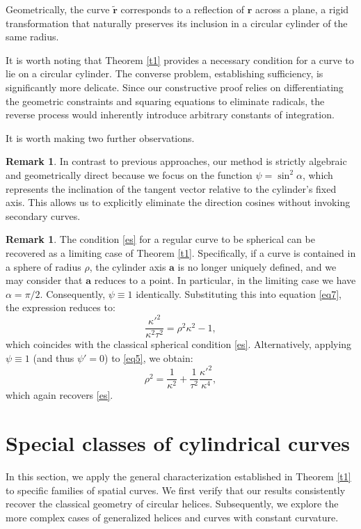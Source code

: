 \documentclass[a4paper,12pt]{amsart}
\theoremstyle{plain}
\theoremstyle{definition}
\newtheorem{remark}[theorem]{Remark}
\newcommand{\bfr}{\mathbf{r}}
\newcommand{\bfa}{\mathbf{a}}
\begin{document}
Geometrically, the curve $\tilde{\bfr}$ corresponds to a reflection of $\bfr$ across a plane, a rigid transformation that naturally preserves its inclusion in a circular cylinder of the same radius.

It is worth noting that Theorem \ref{t1} provides a necessary condition for a curve to lie on a circular cylinder. The converse problem, establishing sufficiency, is significantly more delicate. Since our constructive proof relies on differentiating the geometric constraints and squaring equations to eliminate radicals, the reverse process would inherently introduce arbitrary constants of integration. 


It is worth making two further observations.

\begin{remark}
 In contrast to previous approaches, our method is strictly algebraic 
and geometrically direct because we focus on the  function $\psi = \sin^2\alpha$, 
which represents the inclination of the tangent vector relative to the cylinder's fixed axis. 
This allows us to explicitly eliminate the direction cosines 
without invoking secondary curves. 
 
\end{remark}

\begin{remark}
The condition \eqref{es} for a regular curve to be spherical can be recovered as a limiting case of Theorem \ref{t1}. Specifically, if a curve is contained in a sphere of radius $\rho$, the cylinder axis $\mathbf{a}$ is no longer uniquely defined, and we may consider that $\bfa$ reduces to a point. In particular, in the limiting case we have $\alpha = \pi/2$. Consequently, $\psi \equiv 1$ identically. Substituting this into equation \eqref{eq7}, the expression reduces to:
$$\frac{\kappa'^2}{\kappa^2 \tau^2} = \rho^2 \kappa^2 - 1,$$
which coincides with the classical spherical condition \eqref{es}. Alternatively, applying $\psi \equiv 1$ (and thus $\psi' = 0$) to \eqref{eq5}, we obtain:
$$\rho^2 = \frac{1}{\kappa^2} + \frac{1}{\tau^2} \frac{\kappa'^2}{\kappa^4},$$
which again recovers \eqref{es}.
\end{remark}


\section{Special classes of cylindrical curves}\label{s3}


In this section, we apply the general characterization established in Theorem \ref{t1} to specific families of spatial curves. We first verify that our results consistently recover the classical geometry of circular helices. Subsequently, we explore the more complex cases of generalized helices and curves with constant curvature.
\end{document}
